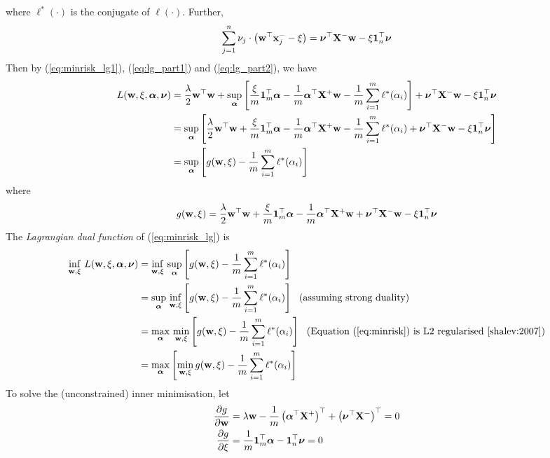 where $\ell^*(\cdot)$ is the conjugate of $\ell(\cdot)$.
Further, 
\begin{equation}
\label{eq:lg_part2}
\sum_{j=1}^n \nu_j \cdot \left( \mathbf{w}^\top \mathbf{x}_j^- - \xi \right) = \bm{\nu}^\top \mathbf{X}^- \mathbf{w} - \xi \mathbf{1}_n^\top \bm{\nu}
\end{equation}
Then by (\ref{eq:minrisk_lg1}), (\ref{eq:lg_part1}) and (\ref{eq:lg_part2}), we have
\begin{align*}
L(\mathbf{w}, \xi, \bm{\alpha}, \bm{\nu}) 
&= \frac{\lambda}{2} \mathbf{w}^\top \mathbf{w} + 
   \sup_{\bm{\alpha}} \left[ \frac{\xi}{m} \mathbf{1}_m^\top \bm{\alpha} - \frac{1}{m} \bm{\alpha}^\top \mathbf{X}^+ \mathbf{w} - \frac{1}{m} \sum_{i=1}^m \ell^*(\alpha_i) \right] +
   \bm{\nu}^\top \mathbf{X}^- \mathbf{w} - \xi \mathbf{1}_n^\top \bm{\nu} \\
&= \sup_{\bm{\alpha}} \left[ 
   \frac{\lambda}{2} \mathbf{w}^\top \mathbf{w} + 
   \frac{\xi}{m} \mathbf{1}_m^\top \bm{\alpha} - \frac{1}{m} \bm{\alpha}^\top \mathbf{X}^+ \mathbf{w} - \frac{1}{m} \sum_{i=1}^m \ell^*(\alpha_i) +
   \bm{\nu}^\top \mathbf{X}^- \mathbf{w} - \xi \mathbf{1}_n^\top \bm{\nu} \right] \\
&= \sup_{\bm{\alpha}} \left[ g(\mathbf{w}, \xi) - \frac{1}{m} \sum_{i=1}^m \ell^*(\alpha_i) \right]
\end{align*}
where
$$g(\mathbf{w}, \xi) = \frac{\lambda}{2} \mathbf{w}^\top \mathbf{w} + \frac{\xi}{m} \mathbf{1}_m^\top \bm{\alpha} - \frac{1}{m} \bm{\alpha}^\top \mathbf{X}^+ \mathbf{w} + \bm{\nu}^\top \mathbf{X}^- \mathbf{w} - \xi \mathbf{1}_n^\top \bm{\nu}$$
The \emph{Lagrangian dual function} of (\ref{eq:minrisk_lg}) is
\begin{equation}
\label{eq:lg_dual_func}
\begin{aligned}
\inf_{\mathbf{w}, \xi} \, L(\mathbf{w}, \xi, \bm{\alpha}, \bm{\nu}) 
&= \inf_{\mathbf{w}, \xi}  \, \sup_{\bm{\alpha}} \left[ g(\mathbf{w}, \xi) - \frac{1}{m} \sum_{i=1}^m \ell^*(\alpha_i) \right] \\
&= \sup_{\bm{\alpha}} \, \inf_{\mathbf{w}, \xi} \left[ g(\mathbf{w}, \xi) - \frac{1}{m} \sum_{i=1}^m \ell^*(\alpha_i) \right] ~~ \text{(assuming strong duality)} \\
&= \max_{\bm{\alpha}} \, \min_{\mathbf{w}, \xi} \left[ g(\mathbf{w}, \xi) - \frac{1}{m} \sum_{i=1}^m \ell^*(\alpha_i) \right] ~~ \text{(Equation (\ref{eq:minrisk}) is L2 regularised~\cite{shalev:2007})} \\
&= \max_{\bm{\alpha}} \left[ \min_{\mathbf{w}, \xi} g(\mathbf{w}, \xi) - \frac{1}{m} \sum_{i=1}^m \ell^*(\alpha_i) \right]
\end{aligned}
\end{equation}
To solve the (unconstrained) inner minimisation, let
\begin{align*}
\frac{\partial g}{\partial \mathbf{w}}  &= \lambda \mathbf{w} - \frac{1}{m} \left( \bm{\alpha}^\top \mathbf{X}^+ \right)^\top + \left( \bm{\nu}^\top \mathbf{X}^- \right)^\top = 0 \\
\frac{\partial g}{\partial \xi} &= \frac{1}{m} \mathbf{1}_m^\top \bm{\alpha} - \mathbf{1}_n^\top \bm{\nu} = 0
\end{align*}
